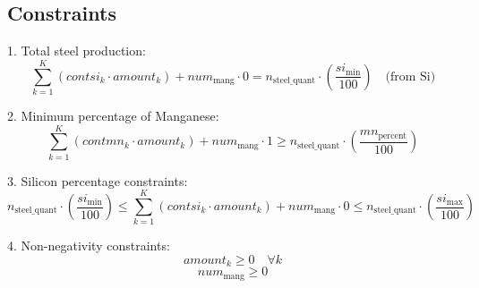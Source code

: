 \documentclass{article}
\begin{document}
\subsection*{Constraints}
1. Total steel production:
\[
\sum_{k=1}^{K} \left( contsi_k \cdot amount_k \right) + num_{\text{mang}} \cdot 0 = n_{\text{steel\_quant}} \cdot \left( \frac{si_{\text{min}}}{100} \right) \quad \text{(from Si)}
\]

2. Minimum percentage of Manganese:
\[
\sum_{k=1}^{K} \left( contmn_k \cdot amount_k \right) + num_{\text{mang}} \cdot 1 \geq n_{\text{steel\_quant}} \cdot \left( \frac{mn_{\text{percent}}}{100} \right)
\]

3. Silicon percentage constraints:
\[
n_{\text{steel\_quant}} \cdot \left( \frac{si_{\text{min}}}{100} \right) \leq \sum_{k=1}^{K} \left( contsi_k \cdot amount_k \right) + num_{\text{mang}} \cdot 0 \leq n_{\text{steel\_quant}} \cdot \left( \frac{si_{\text{max}}}{100} \right)
\]

4. Non-negativity constraints:
\[
amount_k \geq 0 \quad \forall k
\]
\[
num_{\text{mang}} \geq 0
\]
\end{document}
